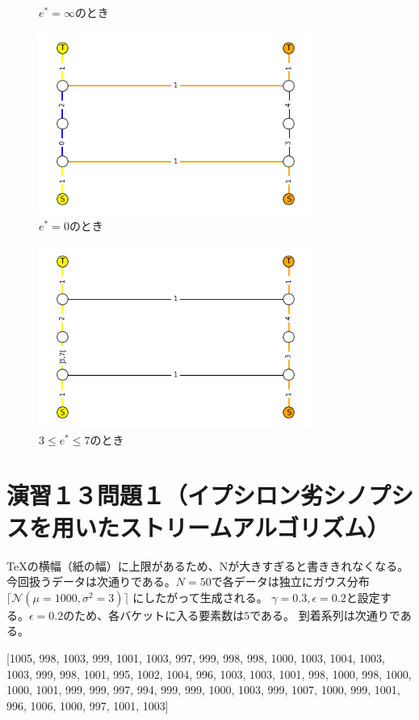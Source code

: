 \documentclass{report}
\begin{document}
\begin{CJK}{UTF8}{min}
\begin{figure}[!h]
        \caption{$e^*=\infty$のとき}
    \end{figure}
    \begin{figure}[!h]
        \centerline{\includegraphics[width=0.8\textwidth]{data/ex12-l0.png}}
        \caption{$e^*=0$のとき}
    \end{figure}
    \begin{figure}[!h]
        \centerline{\includegraphics[width=0.8\textwidth]{data/ex12-res.png}}
        \caption{$3\leq e^* \leq 7$のとき}
    \end{figure}
    \clearpage
    \section*{演習１３問題１（イプシロン劣シノプシスを用いたストリームアルゴリズム）}
    TeXの横幅（紙の幅）に上限があるため、Nが大きすぎると書ききれなくなる。
    今回扱うデータは次通りである。$N=50$で各データは独立にガウス分布 $\lceil\mathcal{N}(\mu=1000,\sigma^2=3)\rceil$ にしたがって生成される。
    $\gamma=0.3,\epsilon=0.2$と設定する。$\epsilon=0.2$のため、各バケットに入る要素数は$5$である。
    到着系列は次通りである。

    [1005, 998, 1003, 999, 1001, 1003, 997, 999, 998, 998, 1000, 1003, 1004, 1003, 1003, 999, 998, 1001, 995, 1002, 1004, 996, 1003, 1003, 1001, 998, 1000, 998, 1000, 1000, 1001, 999, 999, 997, 994, 999, 999, 1000, 1003, 999, 1007, 1000, 999, 1001, 996, 1006, 1000, 997, 1001, 1003]


\end{CJK}
\end{document}
